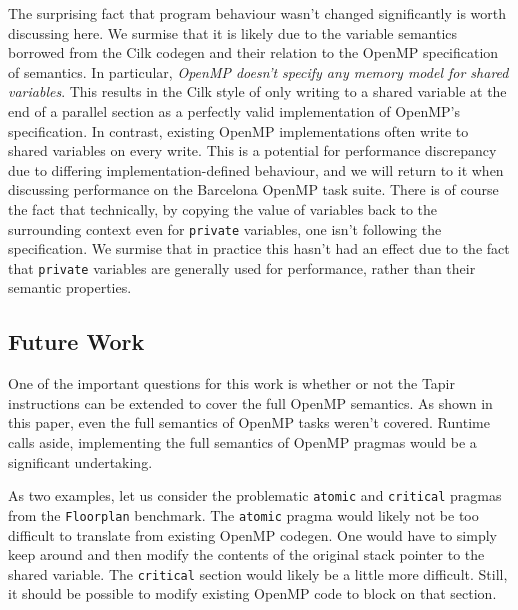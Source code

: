 \documentclass[sigconf]{acmart}
\begin{document}
The surprising fact that program behaviour wasn't changed significantly is
worth discussing here. We surmise that it is likely due to the variable
semantics borrowed from the Cilk codegen and their relation to the OpenMP
specification of semantics. In particular, \emph{OpenMP doesn't specify any
memory model for shared variables}. This results in the Cilk style of only
writing to a shared variable at the end of a parallel section as a perfectly
valid implementation of OpenMP's specification. In contrast, existing OpenMP
implementations often write to shared variables on every write. This is a
potential for performance discrepancy due to differing implementation-defined
behaviour, and we will return to it when discussing performance on the
Barcelona OpenMP task suite. There is of course the fact that technically, by
copying the value of variables back to the surrounding context even for
\texttt{private} variables, one isn't following the specification. We surmise
that in practice this hasn't had an effect due to the fact that
\texttt{private} variables are generally used for performance, rather than
their semantic properties. 

\subsection{Future Work} \label{Sec:Future}

One of the important questions for this work is whether or not the Tapir
instructions can be extended to cover the full OpenMP semantics. As shown
in this paper, even the full semantics of OpenMP tasks weren't covered. Runtime
calls aside, implementing the full semantics of OpenMP pragmas would be a
significant undertaking. 

As two examples, let us consider the problematic \texttt{atomic} and
\texttt{critical} pragmas from the \texttt{Floorplan} benchmark. The 
\texttt{atomic} pragma would likely not be too difficult to translate
from existing OpenMP codegen. One would have to simply keep around and then
modify the contents of the original stack pointer to the shared variable. The
\texttt{critical} section would likely be a little more difficult. Still, it
should be possible to modify existing OpenMP code to block on that section. 
\end{document}
